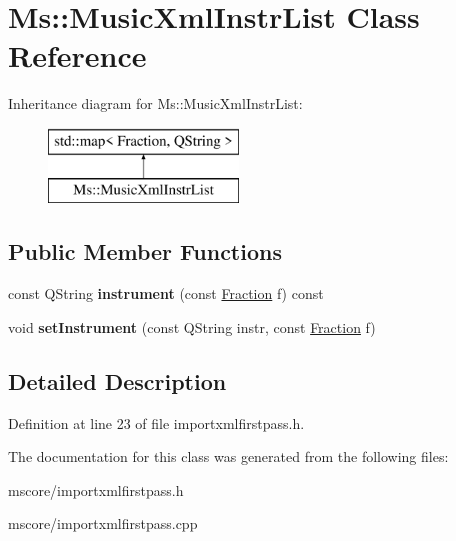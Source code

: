 \hypertarget{class_ms_1_1_music_xml_instr_list}{}\section{Ms\+:\+:Music\+Xml\+Instr\+List Class Reference}
\label{class_ms_1_1_music_xml_instr_list}
Inheritance diagram for Ms\+:\+:Music\+Xml\+Instr\+List\+:\begin{figure}[H]
\begin{center}
\leavevmode
\includegraphics[height=2.000000cm]{class_ms_1_1_music_xml_instr_list}
\end{center}
\end{figure}
\subsection*{Public Member Functions}
\begin{DoxyCompactItemize}
\item 
\mbox{\label{class_ms_1_1_music_xml_instr_list_a2bcb3a867fdc7bf9b37d6e51ea0420f1}} 
const Q\+String {\bfseries instrument} (const \hyperlink{class_ms_1_1_fraction}{Fraction} f) const
\item 
\mbox{\label{class_ms_1_1_music_xml_instr_list_a7e50b83b07431a61731fb71e57909d57}} 
void {\bfseries set\+Instrument} (const Q\+String instr, const \hyperlink{class_ms_1_1_fraction}{Fraction} f)
\end{DoxyCompactItemize}


\subsection{Detailed Description}


Definition at line 23 of file importxmlfirstpass.\+h.



The documentation for this class was generated from the following files\+:\begin{DoxyCompactItemize}
\item 
mscore/importxmlfirstpass.\+h\item 
mscore/importxmlfirstpass.\+cpp\end{DoxyCompactItemize}
